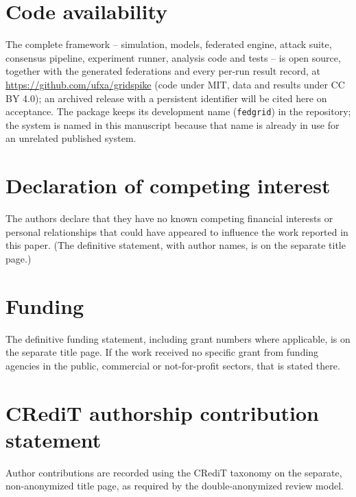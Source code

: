 \section*{Code availability}

The complete framework -- simulation, models, federated engine, attack
suite, consensus pipeline, experiment runner, analysis code and tests --
is open source, together with the generated federations and every per-run
result record, at \url{https://github.com/ufxa/gridspike} (code under
MIT, data and results under CC BY 4.0); an archived release with a
persistent identifier will be cited here on acceptance. The
package keeps its development name (\texttt{fedgrid}) in the repository;
the system is named \sysname{} in this manuscript because that name is
already in use for an unrelated published system.

\section*{Declaration of competing interest}

The authors declare that they have no known competing financial interests or
personal relationships that could have appeared to influence the work reported
in this paper. (The definitive statement, with author names, is on the separate
title page.)

\section*{Funding}

The definitive funding statement, including grant numbers where applicable, is
on the separate title page. If the work received no specific grant from funding
agencies in the public, commercial or not-for-profit sectors, that is stated
there.

\section*{CRediT authorship contribution statement}

Author contributions are recorded using the CRediT taxonomy on the separate,
non-anonymized title page, as required by the double-anonymized review model.


